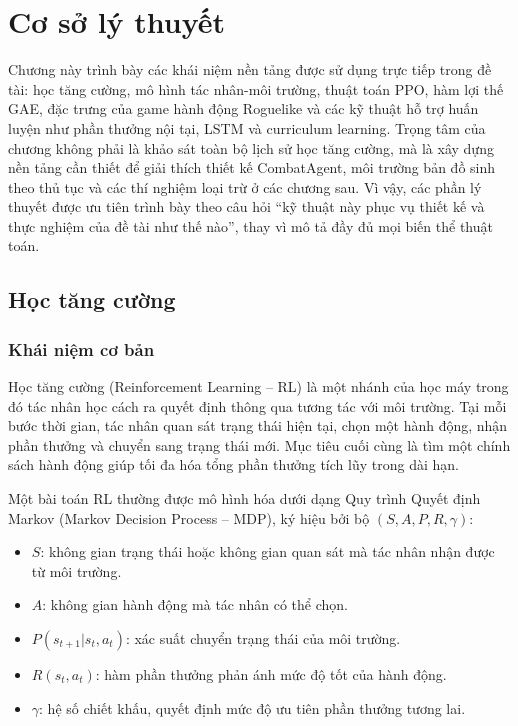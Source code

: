 \clearpage
{}

\setcounter{chapter}{0}
\chapter[{Cơ sở lý thuyết}]{Cơ sở lý thuyết}

Chương này trình bày các khái niệm nền tảng được sử dụng trực tiếp trong đề tài: học tăng cường, mô hình tác nhân-môi trường, thuật toán PPO, hàm lợi thế GAE, đặc trưng của game hành động Roguelike và các kỹ thuật hỗ trợ huấn luyện như phần thưởng nội tại, LSTM và curriculum learning. Trọng tâm của chương không phải là khảo sát toàn bộ lịch sử học tăng cường, mà là xây dựng nền tảng cần thiết để giải thích thiết kế CombatAgent, môi trường bản đồ sinh theo thủ tục và các thí nghiệm loại trừ ở các chương sau. Vì vậy, các phần lý thuyết được ưu tiên trình bày theo câu hỏi ``kỹ thuật này phục vụ thiết kế và thực nghiệm của đề tài như thế nào'', thay vì mô tả đầy đủ mọi biến thể thuật toán.

\section{Học tăng cường}
\subsection{Khái niệm cơ bản}

Học tăng cường (Reinforcement Learning -- RL) là một nhánh của học máy trong đó tác nhân học cách ra quyết định thông qua tương tác với môi trường. Tại mỗi bước thời gian, tác nhân quan sát trạng thái hiện tại, chọn một hành động, nhận phần thưởng và chuyển sang trạng thái mới. Mục tiêu cuối cùng là tìm một chính sách hành động giúp tối đa hóa tổng phần thưởng tích lũy trong dài hạn.

Một bài toán RL thường được mô hình hóa dưới dạng Quy trình Quyết định Markov (Markov Decision Process -- MDP), ký hiệu bởi bộ $(S,A,P,R,\gamma)$:

\begin{itemize}
    \item $S$: không gian trạng thái hoặc không gian quan sát mà tác nhân nhận được từ môi trường.
    \item $A$: không gian hành động mà tác nhân có thể chọn.
    \item $P(s_{t+1}|s_t,a_t)$: xác suất chuyển trạng thái của môi trường.
    \item $R(s_t,a_t)$: hàm phần thưởng phản ánh mức độ tốt của hành động.
    \item $\gamma$: hệ số chiết khấu, quyết định mức độ ưu tiên phần thưởng tương lai.
\end{itemize}

